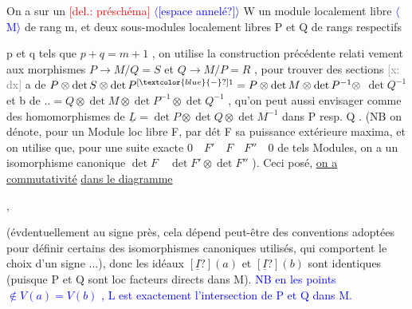 \documentclass[11pt]{article}
\newcommand{\scanpage}[1]{\par\bigskip\noindent{\small\sffamily[scan #1]}\par}
\newcommand{\mspage}[1]{{\small\sffamily[p.\,#1]}}
\newcommand{\hand}[1]{\textcolor{blue}{#1}}
\newcommand{\inserted}[2][]{\textcolor{blue}{$\langle$#2$\rangle$}}
\newcommand{\deleted}[1]{\textcolor{red}{[\textsf{del.:} #1]}}
\newcommand{\xout}[1]{\textcolor{gray}{[\textsf{x:} #1]}}
\newcommand{\uline}[1]{\underline{#1}}
\newcommand{\unsure}[1]{[#1?]}
\newenvironment{diagramblock}{\par\begin{center}}{\end{center}\par}
\begin{document}
On a sur un \deleted{préschéma} \inserted{\unsure{espace annelé}} W un module localement libre \inserted{M} de rang m,
et deux sous-modules localement libres P et Q de rangs respectifs

\mspage{145}

\clearpage
\scanpage{25/146}
\mspage{7}

p et q tels que $p+q=m+1$ , on utilise la construction précédente relati
vement aux morphismes $P\longrightarrow M/Q = S$ et $Q\longrightarrow M/P = R$ , pour trouver
des sections \xout{dx} a de $P \otimes \det S \otimes \det P^{\unsure{\hand{-}}1} = P \otimes \det M \otimes \det P^{-1} \otimes$
$\det Q^{-1}$ et b de $.. = Q \otimes \det M \otimes \det P^{-1} \otimes \det Q^{-1}$ , qu'on peut
aussi envisager comme des homomorphismes de $\underline{L} = \det P \otimes \det Q \otimes \det M^{-1}$
dans P resp. Q . (NB on dénote, pour un Module loc libre F, par dét F
sa puissance extérieure maxima, et on utilise que, pour une suite
exacte $0 \quad F' \quad F \quad F'' \quad 0$ de tels Modules, on a un isomorphisme
canonique $\det F \quad \det F' \otimes \det F''$ ). Ceci posé, \uline{on a commutativité}
\uline{dans le diagramme}

\begin{diagramblock}
\end{diagramblock}
,

(évdentuellement au signe près, cela dépend peut-être des conventions
adoptées pour définir certains des isomorphismes canoniques utilisés,
qui comportent le choix d'un signe ...), donc les idéaux $\unsure{\underline{I}}(a)$ et $\unsure{\underline{I}}(b)$
sont identiques (puisque P et Q sont loc facteurs directs dans M). \hand{NB en}
\hand{les points $\notin V(a)=V(b)$ , L est exactement l'intersection de P et Q dans M.}
\end{document}
